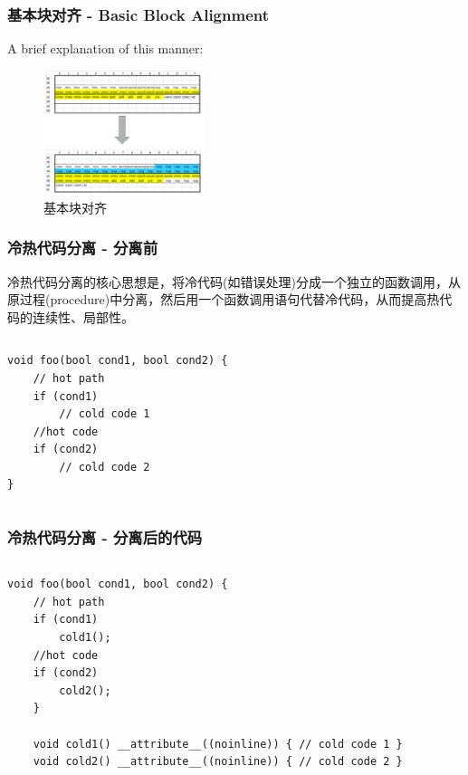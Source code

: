 \begin{frame}
    \frametitle{基本块对齐 - Basic Block Alignment}
    \centering

    A brief explanation of this manner:

    \begin{figure}
        \centering
        \includegraphics[width=0.418\textwidth]{images/alignment.png}
        \caption{基本块对齐}
    \end{figure}

\end{frame}
\begin{frame}[fragile]
    \frametitle{冷热代码分离 - 分离前}
    冷热代码分离的核心思想是，将冷代码(如错误处理)分成一个独立的函数调用，从原过程(procedure)中分离，然后用一个函数调用语句代替冷代码，从而提高热代码的连续性、局部性。
    \begin{columns}
        \begin{column}{0.7\textwidth}
            \begin{lstlisting}
void foo(bool cond1, bool cond2) {
    // hot path
    if (cond1)
        // cold code 1
    //hot code
    if (cond2)
        // cold code 2
}
            \end{lstlisting}
        \end{column}
    \end{columns}
\end{frame}


\begin{frame}[fragile]
    \frametitle{冷热代码分离 - 分离后的代码}
    \begin{columns}
        \begin{column}{1.0\textwidth}
            \begin{lstlisting}
void foo(bool cond1, bool cond2) {
    // hot path
    if (cond1)
        cold1(); 
    //hot code
    if (cond2)
        cold2(); 
    }
    
    void cold1() __attribute__((noinline)) { // cold code 1 }
    void cold2() __attribute__((noinline)) { // cold code 2 }
            \end{lstlisting}
        \end{column}
    \end{columns}
\end{frame}


